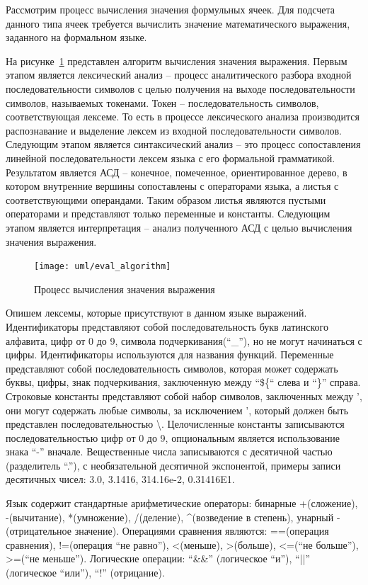\documentclass[14pt,a4paper]{reportmod}
\begin{document}
Рассмотрим процесс вычисления значения формульных ячеек. Для подсчета данного типа ячеек требуется вычислить значение математического выражения, заданного на формальном языке.

На рисунке~\ref{pic:evalprocess} представлен алгоритм вычисления значения выражения. Первым этапом является лексический анализ -- процесс аналитического разбора входной последовательности символов  с целью получения на выходе последовательности символов, называемых токенами. Токен -- последовательность символов, соответствующая лексеме. То есть в процессе лексического анализа производится распознавание и выделение лексем из входной последовательности символов. Следующим этапом является синтаксический анализ --  это процесс сопоставления линейной последовательности лексем языка с его формальной грамматикой. Результатом является АСД -- конечное, помеченное, ориентированное дерево, в котором внутренние вершины сопоставлены с операторами языка, а листья с соответствующими операндами. Таким образом листья являются пустыми операторами и представляют только переменные и константы. Следующим этапом является интерпретация -- анализ полученного АСД с целью вычисления значения выражения.

\begin{figure}
  \centering
  \texttt{[image: uml/eval\_algorithm]}
  \caption{Процесс вычисления значения выражения}
  \label{pic:evalprocess}
\end{figure}

Опишем лексемы, которые присутствуют в данном языке выражений. Идентификаторы представляют собой последовательность букв латинского алфавита, цифр от 0 до 9, символа подчеркивания(``\_''), но не могут начинаться с цифры. Идентификаторы используются для названия функций. Переменные представляют собой последовательность символов, которая может содержать буквы, цифры, знак подчеркивания, заключенную между ``\$\{`` слева и ``\}'' справа. Строковые константы представляют собой набор символов, заключенных между ', они могут содержать любые символы, за исключением ', который должен быть представлен последовательностью \textbackslash \textquotesingle. Целочисленные константы записываются последовательностью цифр от 0 до 9, опциональным является использование знака ``-'' вначале. Вещественные числа записываются с десятичной частью (разделитель ``.''), с необязательной десятичной экспонентой, примеры записи десятичных чисел: 3.0, 3.1416, 314.16e-2, 0.31416E1.

Язык содержит стандартные арифметические операторы: бинарные +(сложение), -(вычитание), *(умножение), /(деление), \textasciicircum (возведение в степень), унарный -(отрицательное значение). Операциями сравнения являются: ==(операция сравнения), !=(операция ``не равно''), <(меньше), >(больше), <=(``не больше''), >=(``не меньше''). Логические операции: ``\&\&'' (логическое ``и''), ``||'' (логическое ``или''), ``!'' (отрицание).
\end{document}
